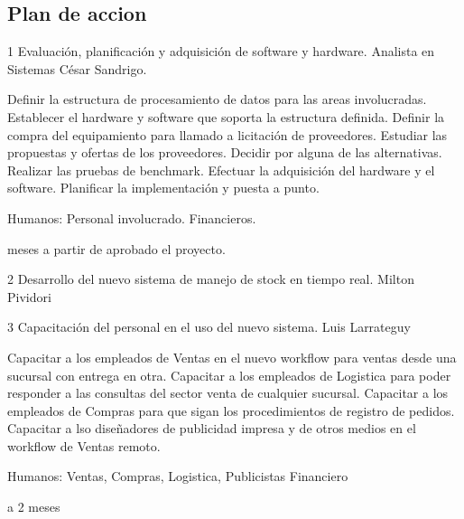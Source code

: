 \subsection{Plan de accion}

\begin{proyecto}
{1}
{Evaluación, planificación y adquisición de software y hardware.}
{Analista en Sistemas César Sandrigo.}

  \begin{etapas}
    \etapa Definir la estructura de procesamiento de datos para las areas involucradas.
    \etapa Establecer el hardware y software que soporta la estructura definida.
    \etapa Definir la compra del equipamiento para llamado a licitación de proveedores.
    \etapa Estudiar las propuestas y ofertas de los proveedores.
    \etapa Decidir por alguna de las alternativas.
    \etapa Realizar las pruebas de benchmark.
    \etapa Efectuar la adquisición del hardware y el software.
    \etapa Planificar la implementación y puesta a punto.
  \end{etapas}

  \begin{recursos}
    \recurso Humanos: Personal involucrado.
    \recurso Financieros.
  \end{recursos}

   meses a partir de aprobado el proyecto.
\end{proyecto}


\begin{proyecto}
{2}
{Desarrollo del nuevo sistema de manejo de stock en tiempo real.}
{Milton Pividori}

  \begin{etapas}
    \etapa {}
  \end{etapas}

  \begin{recursos}
    \recurso {}
  \end{recursos}

  \tiempo {}
\end{proyecto}


\begin{proyecto}
{3}
{Capacitación del personal en el uso del nuevo sistema.}
{Luis Larrateguy}

  \begin{etapas}
    \etapa Capacitar a los empleados de Ventas en el nuevo workflow para ventas
desde una sucursal con entrega en otra.
    \etapa Capacitar a los empleados de Logistica para poder responder a las
consultas del sector venta de cualquier sucursal.
    \etapa Capacitar a los empleados de Compras para que sigan los 
procedimientos de registro de pedidos.
    \etapa Capacitar a lso diseñadores de publicidad impresa y de otros medios
en el workflow de Ventas remoto.
  \end{etapas}

  \begin{recursos}
    \recurso Humanos: Ventas, Compras, Logistica, Publicistas
	\recurso Financiero
  \end{recursos}

   a 2 meses
\end{proyecto}


